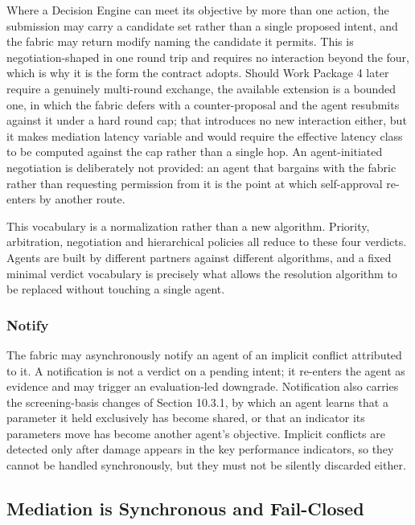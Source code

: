 Where a Decision Engine can meet its objective by more than one action,
the submission may carry a candidate set rather than a single proposed
intent, and the fabric may return modify naming the candidate it
permits. This is negotiation-shaped in one round trip and requires no
interaction beyond the four, which is why it is the form the contract
adopts. Should Work Package 4 later require a genuinely multi-round
exchange, the available extension is a bounded one, in which the fabric
defers with a counter-proposal and the agent resubmits against it under
a hard round cap; that introduces no new interaction either, but it
makes mediation latency variable and would require the effective latency
class to be computed against the cap rather than a single hop. An
agent-initiated negotiation is deliberately not provided: an agent that
bargains with the fabric rather than requesting permission from it is
the point at which self-approval re-enters by another route.

This vocabulary is a normalization rather than a new algorithm.
Priority, arbitration, negotiation and hierarchical policies all reduce
to these four verdicts. Agents are built by different partners against
different algorithms, and a fixed minimal verdict vocabulary is
precisely what allows the resolution algorithm to be replaced without
touching a single agent.

\hypertarget{notify}{%
\subsubsection{Notify}\label{notify}}

The fabric may asynchronously notify an agent of an implicit conflict
attributed to it. A notification is not a verdict on a pending intent;
it re-enters the agent as evidence and may trigger an evaluation-led
downgrade. Notification also carries the screening-basis changes of
Section 10.3.1, by which an agent learns that a parameter it held
exclusively has become shared, or that an indicator its parameters move
has become another agent's objective. Implicit conflicts are detected
only after damage appears in the key performance indicators, so they
cannot be handled synchronously, but they must not be silently discarded
either.

\hypertarget{mediation-is-synchronous-and-fail-closed}{%
\subsection{Mediation is Synchronous and Fail-Closed}\label{mediation-is-synchronous-and-fail-closed}}

